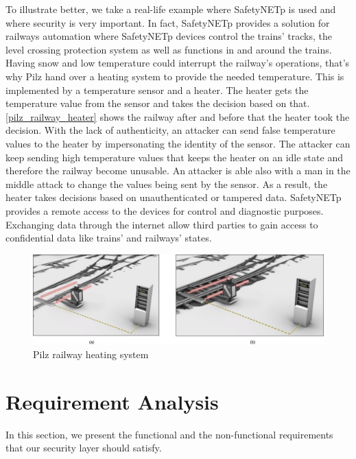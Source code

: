To illustrate better, we take a real-life example where SafetyNETp is used and where security is very important.
In fact, SafetyNETp provides a solution for railways automation \cite{pilz_rail_engineering} where SafetyNETp devices control the trains' tracks, the
level crossing protection system as well as functions in and around the trains. Having snow and low temperature could interrupt
the railway's operations, that's why Pilz hand over a heating system to provide the needed temperature. This is implemented by a temperature sensor
and a heater. The heater gets the temperature value from the sensor and takes the decision based on that. \autoref{pilz_railway_heater} shows
the railway after and before that the heater took the decision. With the lack of authenticity, an attacker can send false temperature values
to the heater by impersonating the identity of the sensor. The attacker can keep sending high temperature values that keeps the heater
on an idle state and therefore the railway become unusable. An attacker is able also with a man in the middle attack to change the values being
sent by the sensor. As a result, the heater takes decisions based on unauthenticated or tampered data.
SafetyNETp provides a remote access to the devices for control and diagnostic purposes. Exchanging data through the internet
allow third parties to gain access to confidential data like trains' and railways' states.

\begin{figure}[H]
\centering
\includegraphics[width=17cm]{figures/requirements/railway_heater.jpg}
\caption[Pilz railway heater system]{Pilz railway heating system\cite{pilz_rail_engineering}}\label{pilz_railway_heater}
\end{figure}






\section{Requirement Analysis}

In this section, we present the functional and the non-functional requirements that our security layer should satisfy.

